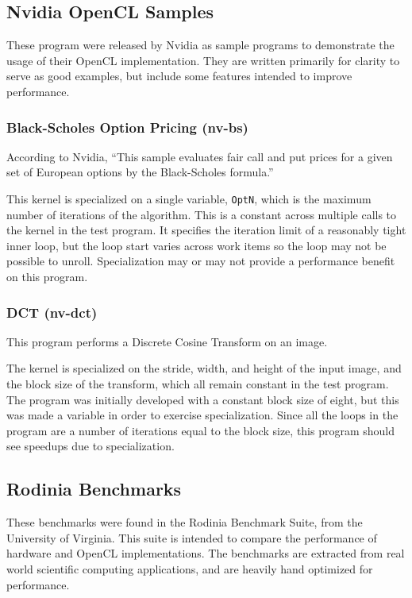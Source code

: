 \documentclass{acm_proc_article-sp}
\begin{document}
\subsection{Nvidia OpenCL Samples}

These program were released by Nvidia as sample programs to demonstrate the
usage of their OpenCL implementation. They are written primarily for clarity to
serve as good examples, but include some features intended to improve
performance.

\subsubsection{Black-Scholes Option Pricing (nv-bs)}

According to Nvidia, ``This sample evaluates fair call and put prices for a
given set of European options by the Black-Scholes formula.'' 

This kernel is specialized on a single variable, {\tt OptN}, which is the maximum
number of iterations of the algorithm. This is a constant across multiple calls
to the kernel in the test program. It specifies the iteration limit of a
reasonably tight inner loop, but the loop start varies across work items so the
loop may not be possible to unroll. Specialization may or may not provide a
performance benefit on this program.

\subsubsection{DCT (nv-dct)}

This program performs a Discrete Cosine Transform on an image.

The kernel is specialized on the stride, width, and height of the input image,
and the block size of the transform, which all remain constant in the test
program. The program was initially developed with a constant block size of
eight, but this was made a variable in order to exercise specialization. Since
all the loops in the program are a number of iterations equal to the block size,
this program should see speedups due to specialization.

\subsection{Rodinia Benchmarks}

These benchmarks were found in the Rodinia Benchmark
Suite\cite{Rodinia:Benchmarks}, from the University of Virginia. This suite is
intended to compare the performance of hardware and OpenCL implementations.
The benchmarks are extracted from real world scientific computing applications,
and are heavily hand optimized for performance.
\end{document}
